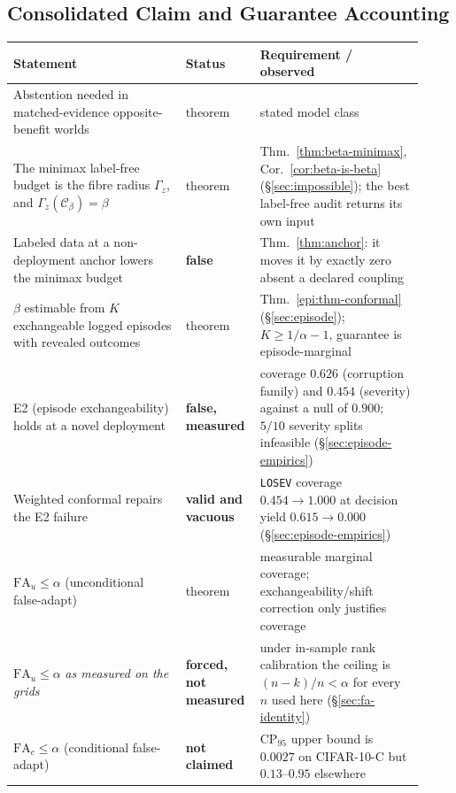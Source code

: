 \subsection{Consolidated Claim and Guarantee Accounting}\label{sec:guarantees}
\begin{center}
\scriptsize
\renewcommand{\arraystretch}{1.12}
\setlength{\tabcolsep}{4pt}
\begin{tabular}{@{}p{0.40\linewidth}p{0.14\linewidth}p{0.38\linewidth}@{}}
\toprule
Statement & Status & Requirement / observed \\
\midrule
Abstention needed in matched-evidence opposite-benefit worlds & theorem & stated model class \\
The minimax label-free budget is the fibre radius $\Gamma_z$, and $\Gamma_z(\mathcal C_\beta)=\beta$ & theorem & Thm.~\ref{thm:beta-minimax}, Cor.~\ref{cor:beta-is-beta} (\S\ref{sec:impossible}); the best label-free audit returns its own input \\
Labeled data at a non-deployment anchor lowers the minimax budget & \textbf{false} & Thm.~\ref{thm:anchor}: it moves it by exactly zero absent a declared coupling \\
$\beta$ estimable from $K$ exchangeable logged episodes with revealed outcomes & theorem & Thm.~\ref{epi:thm-conformal} (\S\ref{sec:episode}); $K\ge1/\alpha-1$, guarantee is episode-marginal \\
E2 (episode exchangeability) holds at a novel deployment & \textbf{false, measured} & coverage $0.626$ (corruption family) and $0.454$ (severity) against a null of $0.900$; $5/10$ severity splits infeasible (\S\ref{sec:episode-empirics}) \\
Weighted conformal repairs the E2 failure & \textbf{valid and vacuous} & \texttt{LOSEV} coverage $0.454\to1.000$ at decision yield $0.615\to0.000$ (\S\ref{sec:episode-empirics}) \\
$\mathrm{FA}_u \le \alpha$ (unconditional false-adapt) & theorem & measurable marginal coverage; exchangeability/shift correction only justifies coverage \\
$\mathrm{FA}_u \le \alpha$ \emph{as measured on the grids} & \textbf{forced, not measured} & under in-sample rank calibration the ceiling is $(n{-}k)/n<\alpha$ for every $n$ used here (\S\ref{sec:fa-identity}) \\
$\mathrm{FA}_c \le \alpha$ (conditional false-adapt) & \textbf{not claimed} & CP$_{95}$ upper bound is $0.0027$ on CIFAR-10-C but $0.13$--$0.95$ elsewhere \\

\end{tabular}
\end{center}
